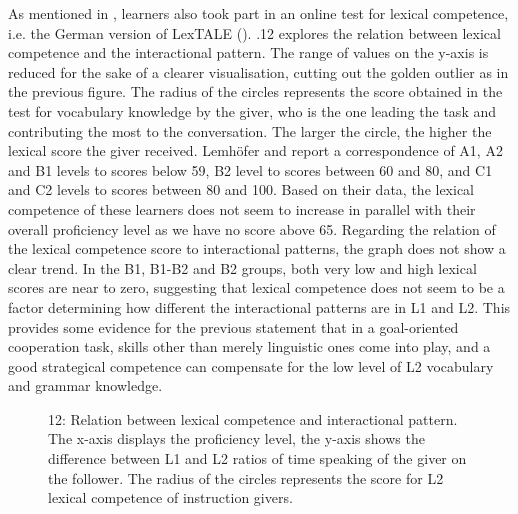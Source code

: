 As mentioned in , learners also took part in an online test for lexical competence, i.e. the German version of LexTALE (\citealt{LemhöferBroersma2012}). .12 explores the relation between lexical competence and the interactional pattern. The range of values on the y-axis is reduced for the sake of a clearer visualisation, cutting out the golden outlier as in the previous figure. The radius of the circles represents the score obtained in the test for vocabulary knowledge by the giver, who is the one leading the task and contributing the most to the conversation. The larger the circle, the higher the lexical score the giver received. Lemhöfer and \citet[341]{Broersma2012} report a correspondence of A1, A2 and B1 levels to scores below 59, B2 level to scores between 60 and 80, and C1 and C2 levels to scores between 80 and 100. Based on their data, the lexical competence of these learners does not seem to increase in parallel with their overall proficiency level as we have no score above 65. Regarding the relation of the lexical competence score to interactional patterns, the graph does not show a clear trend. In the B1, B1-B2 and B2 groups, both very low and high lexical scores are near to zero, suggesting that lexical competence does not seem to be a factor determining how different the interactional patterns are in L1 and L2. This provides some evidence for the previous statement that in a goal-oriented cooperation task, skills other than merely linguistic ones come into play, and a good strategical competence can compensate for the low level of L2 vocabulary and grammar knowledge.

\begin{stylecaption}
  
 
\end{stylecaption}

\begin{stylecaption}\begin{figure}
\caption{12: Relation between lexical competence and interactional pattern. The x-axis displays the proficiency level, the y-axis shows the difference between L1 and L2 ratios of time speaking of the giver on the follower. The radius of the circles represents the score for L2 lexical competence of instruction givers.} 
\label{fig:key:3}
\end{figure}\end{stylecaption}

